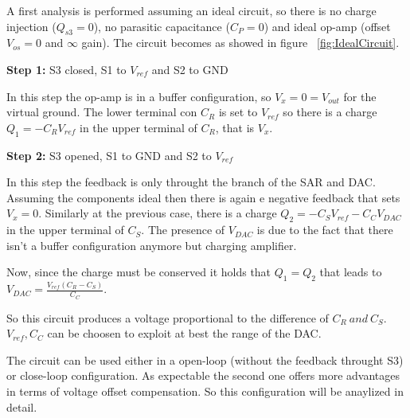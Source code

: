 A first analysis is performed assuming an ideal circuit, so there is no charge injection ($Q_{s3} = 0$), no parasitic capacitance ($C_P = 0$) and ideal op-amp (offset $V_{os} = 0$ and $\infty$ gain). The circuit becomes as showed in figure \Fig~\ref{fig:IdealCircuit}.

\textbf{Step 1:} S3 closed, S1 to $V_{ref}$ and S2 to GND

In this step the op-amp is in a buffer configuration, so $V_x = 0 = V_{out}$ for the virtual ground. The lower terminal con $C_R$ is set to $V_{ref}$ so there is a charge $Q_1 = -C_R V_{ref}$ in the upper terminal of $C_R$, that is $V_x$.

\textbf{Step 2:} S3 opened, S1 to GND and S2 to $V_{ref}$

In this step the feedback is only throught the branch of the SAR and DAC. Assuming the components ideal then there is again e negative feedback that sets $V_x = 0$. Similarly at the previous case, there is a charge $Q_2 = -C_S V_{ref} - C_C V_{DAC}$ in the upper terminal of $C_S$. The presence of $V_{DAC}$ is due to the fact that there isn't a buffer configuration anymore but charging amplifier.

Now, since the charge must be conserved it holds that $Q_1 = Q_2$ that leads to $V_{DAC} = \frac{V_{ref}(C_R - C_S)}{C_C}$. 

So this circuit produces a voltage proportional to the difference of $C_R \ and \ C_S$. $V_{ref},C_C$ can be choosen to exploit at best the range of the DAC.

The circuit can be used either in a open-loop (without the feedback throught S3) or close-loop configuration. As expectable the second one offers more advantages in terms of voltage offset compensation. So this configuration will be anaylized in detail.